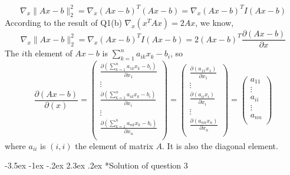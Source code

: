 \documentclass[12pt]{article}
\makeatletter
\renewcommand\section{\@startsection {section}{1}{\z@}%
	{-3.5ex \@plus -1ex \@minus -.2ex}%
	{2.3ex \@plus.2ex}%
	{\normalfont\large\bfseries}}%
\makeatother
\begin{document}
	\begin{equation}\label{Ax-b_grad_1}
	\nabla_x\lVert Ax-b\rVert_2^2
	=\nabla_x (Ax-b)^T(Ax-b)
	=\nabla_x (Ax-b)^TI(Ax-b)
	\end{equation}
	According to the result of Q1(b) $\nabla_x(x^TAx)=2Ax$, we know,
	\begin{equation}\label{Ax-b_grad_2}
	\nabla_x\lVert Ax-b\rVert_2^2
	=\nabla_x (Ax-b)^TI(Ax-b)
	=2(Ax-b)^T\frac{\partial(Ax-b)}{\partial x}
	\end{equation}
	The $i$th element of $Ax-b$ is $\sum_{k=1}^n a_{ik}x_k-b_i$, so 
	\begin{equation}\label{Ax-b_grad_3}
	\frac{\partial(Ax-b)}{\partial(x)}
	=
	\left(  
	\begin{array}{c}  
	\frac{\partial(\sum_{k=1}^n a_{1k}x_k-b_i)}{\partial x_1} \\
	\vdots \\
	\frac{\partial(\sum_{k=1}^n a_{ik}x_k-b_i)}{\partial x_i} \\
	\vdots \\
	\frac{\partial(\sum_{k=1}^n a_{nk}x_k-b_i)}{\partial x_n} \\
	\end{array}
	\right)
	=
	\left(  
	\begin{array}{c}  
	\frac{\partial(a_{11}x_1)}{\partial x_1} \\
	\vdots \\
	\frac{\partial(a_{ii}x_i)}{\partial x_i} \\
	\vdots \\
	\frac{\partial(a_{nn}x_n)}{\partial x_n} \\
	\end{array}
	\right)
	=
	\left(  
	\begin{array}{c}  
	a_{11} \\
	\vdots \\
	a_{ii} \\
	\vdots \\
	a_{nn} \\
	\end{array}
	\right)
	\end{equation}
	where $a_{ii}$ is $(i, i)$ the element of matrix $A$. It is also the diagonal element.
	
	\section*{Solution of question 3}
\end{document}
